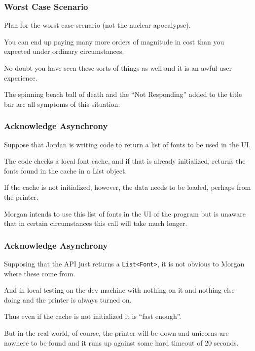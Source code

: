 \begin{frame}
\frametitle{Worst Case Scenario}

Plan for the worst case scenario (not the nuclear apocalypse).

You can end up paying many more orders of magnitude in cost than you expected under ordinary circumstances.

No doubt you have seen these sorts of things as well and it is an awful user experience. 

The spinning beach ball of death and the ``Not Responding'' added to the title bar are all symptoms of this situation. 


\end{frame}



\begin{frame}
\frametitle{Acknowledge Asynchrony}

Suppose that Jordan is writing code to return a list of fonts to be used in the UI. 

The code checks a local font cache, and if that is already initialized, returns the fonts found in the cache in a List object. 

If the cache is not initialized, however, the data needs to be loaded, perhaps from the printer. 

Morgan intends to use this list of fonts in the UI of the program but is unaware that in certain circumstances this call will take much longer.

\end{frame}



\begin{frame}
\frametitle{Acknowledge Asynchrony}

Supposing that the API just returns a \texttt{List<Font>}, it is not obvious to Morgan where these come from. 

And in local testing on the dev machine with nothing on it and nothing else doing and the printer is always turned on.

Thus even if the cache is not initialized it is ``fast enough''. 

But in the real world, of course, the printer will be down and unicorns are nowhere to be found and it runs up against some hard timeout of 20 seconds. 

\end{frame}



